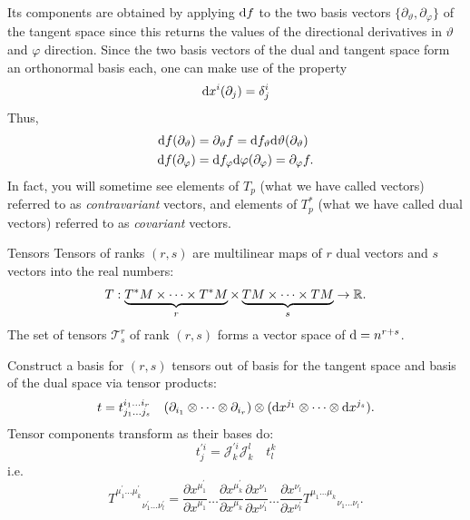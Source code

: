 Its components are obtained by applying $\mathrm{d} f$ to the two basis vectors $\{\partial_{\vartheta},\partial_{\varphi}\}$ of the tangent space since this returns the values of the directional derivatives in $\vartheta$ and $\varphi$ direction. Since the two basis vectors of the dual and tangent space form an orthonormal basis each, one can make use of the property 
\begin{equation}
	\mathrm{d} x^i(\partial_j) = \delta^i_j
\end{equation}
Thus,
\begin{align}
	\mathrm{d} f(\partial_{\vartheta}) &= \partial_{\vartheta} f = \mathrm{d} f_{\vartheta} \mathrm{d} \vartheta(\partial_{\vartheta})\\
	\mathrm{d} f(\partial_{\varphi}) &= \mathrm{d} f_{\varphi} \mathrm{d} \varphi(\partial_{\varphi}) = \partial_{\varphi} f.
\end{align}
	In fact, you will sometime see elements of $T_p$ (what we have called vectors) referred to
	as \emph{contravariant} vectors, and elements of $T^*_p$  (what we have called dual vectors) referred
	to as \emph{covariant} vectors.
\begin{mybox}{Tensors}
	Tensors of ranks $(r,s)$ are multilinear maps of $r$ dual vectors and $s$ vectors into the real numbers:
	\begin{equation}
	T:\underbrace{T^*M\times \dots \times T^*M}_{r} \times \underbrace{TM\times \dots \times TM}_{s} \rightarrow \mathbb{R}.
	\end{equation}
	The set of tensors $\mathcal{T}^r_s$ of rank $(r,s)$ forms a vector space of $\mathrm{d}=n^{r+s}$.
\end{mybox}
Construct a basis for $(r,s)$ tensors out of basis for the tangent space and basis of the dual space via tensor products:
\begin{equation}
t=t^{i_1 \dots i_r}_{j_1 \dots j_s}  \quad (\partial_{i_1} \otimes \dots \otimes \partial_{i_r})\otimes (\mathrm{d} x^{j_1} \otimes \dots \otimes \mathrm{d} x^{j_s}).
\end{equation}
Tensor components transform as their bases do:
\begin{equation}
t^{' i}_j = \mathcal{J}^{'i}_k \mathcal{J}^l_k \quad t^k_l
\end{equation}
i.e. 
\begin{equation}
	T^{\mu^\prime_1 \dots \mu^\prime_k}_{\quad \quad \quad  \nu^\prime_1 \dots \nu^\prime_l} = \frac{\partial x^{\mu^\prime_1}}{\partial x^{\mu_1}} \dots \frac{\partial x^{\mu^\prime_k}}{\partial x^{\mu_k}} \frac{\partial x^{\nu_1}}{\partial x^{\nu^\prime_1}} \dots \frac{\partial x^{\nu_l}}{\partial x^{\nu^\prime_l}} T^{\mu_1 \dots \mu_k}_{\quad \quad \quad \nu_1 \dots \nu_l}.
\end{equation}
